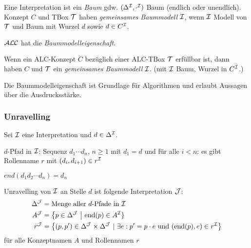 Eine Interpretation ist ein \emph{Baum} gdw. $(\Delta^{\mathcal{I}}, \cdot^{\mathcal{I}})$
Baum (endlich oder unendlich). Konzept $C$ und TBox $\mathcal{T}$ haben
\emph{gemeinsames Baummodell} $\mathcal{I}$, wenn $\mathcal{I}$ Modell von $\mathcal{T}$ und Baum mit
Wurzel $d$ sowie $d \in C^{\mathcal{I}}$.


$\mathcal{A}\mathcal{L}\mathcal{C}$ hat die \emph{Baummodelleigenschaft}.

\begin{theorem}
    \label{theorem-3.6}
    \label{thm:baummodell}
Wenn ein ALC-Konzept $C$ bezüglich einer ALC-TBox $\mathcal{T}$ erfüllbar ist,
dann haben $C$ und $\mathcal{T}$ ein \emph{gemeinsames Baummodell} $\mathcal{I}$. (mit $\mathcal{I}$ Baum, Wurzel in $C^{\mathcal{I}}$.)
\end{theorem}

\begin{tafel}[TODO]

\end{tafel}

Die Baummodelleigenschaft ist Grundlage für Algorithmen und erlaubt Aussagen über die Ausdrucksstärke.

\subsubsection{Unravelling}\label{unravelling}

Sei $\mathcal{I}$ eine Interpretation und $d \in \Delta^{\mathcal{I}}$. 

$d$-Pfad in $\mathcal{I}$: Sequenz $d_1\cdots d_n$, $n \geq 1$ mit $d_1 = d$ und
für alle $i < n$: es gibt Rollenname $r$ mit $(d_i, d_{i + 1}) \in r^{\mathcal{I}}$

$\mathit{end}(d_1d_2\cdots d_n) = d_n$

\begin{definition}[Unravelling]
Unravelling von $\mathcal{I}$ an Stelle $d$ ist folgende Interpretation $\mathcal{J}$:
\begin{align*}
    \Delta^{\MJ} &= \text{Menge aller }d\text{-Pfade in }\MI\\
    A^{\MJ} &= \left\{ p \in \Delta^{\MJ}\  \right|\text{\ end}\left( p \right) \in A^\MI\}\\
    r^{\MJ} &= \left\{ \left( p,p' \right) \in \Delta^{\MJ} \times \Delta^{\MJ}\ |\ \exists e:p' = p \cdot e\ \mathrm{\text{und}}\ \left( \text{end}\left( p \right),e \right) \in r^\MI \right\}
\end{align*}
für alle Konzeptnamen $A$ und Rollennamen $r$
\end{definition}

\begin{tafel}[TODO]

\end{tafel}

